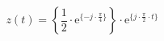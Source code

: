 \correct
\[
z(t) =  \left \{ \frac{1}{2} \cdot \textrm{e}^{\{ -j \cdot \frac{\pi}{4} \}} \right \} \cdot \textrm{e}^{\{ j \cdot \frac{\pi}{2} \cdot t \}}
\]
